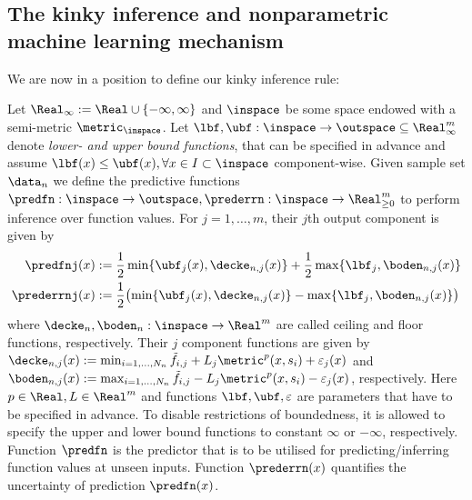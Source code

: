 
\subsection{The kinky inference and nonparametric machine learning mechanism}

We are now in a position to define our kinky inference rule:

\begin{defn} \label{def:KIL}
Let  $\Real_\infty := \Real \cup\{- \infty, \infty\}$ and $\inspace$ be some space endowed with a semi-metric $\metric_\inspace$. Let $\lbf,\ubf: \inspace \to \outspace \subseteq \Real_\infty^m$ denote \textit{lower- and upper bound functions}, that can be specified in advance and assume $\lbf(x) \leq \ubf(x), \forall x \in I \subset \inspace$ component-wise. 
Given sample set $\data_n$ we define the predictive functions $\predfn: \inspace \to \outspace, \prederrn: \inspace \to \Real^m_{\geq 0}$ to perform inference over function values.
For $j=1,\ldots,m$, their $j$th output component is given by  
	\begin{align}
   \predfnj(x) &:= \frac{1}{2} \min\{ \ubf_j(x), \decke_{n,j}(x)\} + \frac{1}{2} \max\{ \lbf_j, \boden_{n,j}(x) \} \label{eq:KIpred}\\  
	\prederrnj(x) &:= \frac{1}{2} \bigl(\min\{ \ubf_j(x), \decke_{n,j}(x)\} - \max\{ \lbf_j, \boden_{n,j}(x) \} \bigr)   
	\end{align}
	where $\decke_n, \boden_n: \inspace \to \Real^m$ are called ceiling and floor functions, respectively. Their $j$ component functions are given by
	$\decke_{n,j}(x) := \min_{i=1,\ldots,N_n}   \tilde f_{i,j} + L_j \metric^p(x,s_i) + \varepsilon_j(x)$ and 
	$\boden_{n,j}(x) := \max_{i=1,\ldots,N_n}   \tilde f_{i,j} - L_j \metric^p(x,s_i) - \varepsilon_j(x)$, respectively.
  Here $p \in \Real, L \in \Real^m$ and functions $\lbf,\ubf,\varepsilon$ are parameters that have to be specified in advance. To disable restrictions of boundedness, it is allowed to specify the upper and lower bound functions to constant $\infty$ or $-\infty$, respectively.	
	Function $\predfn$ is the predictor that is to be utilised for predicting/inferring function values at unseen inputs. Function $\prederrn(x)$ quantifies the uncertainty of prediction $\predfn(x)$. 
\end{defn}

